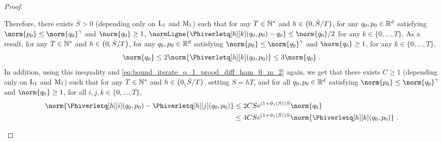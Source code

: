 \begin{proof}
\begin{enumerate}[label=(\roman*),leftmargin=0cm,itemindent=0.5cm,labelwidth=1.2\itemindent,labelsep=0cm,align=left]
Therefore,  there exists $\bar{S} >0$ (depending only on $\mathrm{L}_1$ and $\mathrm{M}_1$) such that for any $T \in \mathbb{N}^{*}$ and $h \in \left(0,\bar{S}/T\right)$, for any $q_0,p_0 \in \mathbb{R}^d$ satisfying $ \norm{\p_0} \leq \norm{\q_0}^{\gamma}$ and $\norm{\q_0} \geq  1 $, $ \normLigne{\Phiverletq[h][k](q_0,p_0)-\q_0} \leq \norm{q_0}/2$ for any $k \in \{0,\ldots,T\}$. As a result, for any $T \in \mathbb{N}^{*}$ and $h \in \left(0,\bar{S}/T\right)$, for any $q_0,p_0 \in \mathbb{R}^d$ satisfying $ \norm{\p_0} \leq \norm{\q_0}^{\gamma}$ and $\norm{\q_0} \geq  1 $,  for any $k \in \{0,\ldots,T\}$,
\begin{equation}
  \norm{\q_0} \leq 2 \norm{\Phiverletq[h][k](q_0,p_0)} \leq 3 \norm{q_0} \eqsp.
\end{equation}
In addition, using this inequality and
\eqref{eq:bound_iterate_q_1_prood_diff_ham_0_m_2} again, we get that there exists $C \geq 1$ (depending only on $\mathrm{L}_1$ and $\mathrm{M}_1$) such that  for any $T \in \mathbb{N}^{*}$ and $h \in \left(0,\bar{S}/T\right)$, setting $S= hT$, and  for
all $q_0,p_0 \in \mathbb{R}^d$ satisfying $ \norm{p_0} \leq
\norm{\q_0}^{\gamma}$ and $\norm{\q_0} \geq 1$, for all $i,j,k \in
\{0,\ldots,T\}$,
\begin{align}
\norm{\Phiverletq[h][i](q_0,p_0) - \Phiverletq[h][j](q_0,p_0)} 
&\leq 2C S \rme^{(1+\vartheta_1(S))S} \norm{\q_0} \\
&\leq 4 C S \rme^{(1+\vartheta_1(S))S}\norm{\Phiverletq[h][k](q_0,p_0)}  \eqsp.
\end{align}
\end{enumerate}
\end{proof}

